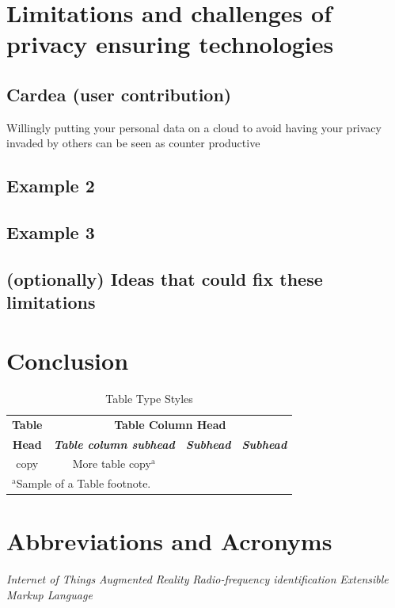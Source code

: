 \documentclass[conference]{IEEEtran}
\begin{document}
\section{Limitations and challenges of privacy ensuring technologies}\label{Limitations}
\subsection{Cardea (user contribution)}
Willingly putting your personal data on a cloud to avoid having your privacy invaded by others can be seen as counter productive
\subsection{Example 2}
\subsection{Example 3}
\subsection{(optionally) Ideas that could fix these limitations}

\section{Conclusion}\label{Conclusion}


\begin{table}[htbp]
\caption{Table Type Styles}
\begin{center}
\begin{tabular}{|c|c|c|c|}
\hline
\textbf{Table}&\multicolumn{3}{|c|}{\textbf{Table Column Head}} \\
\cline{2-4} 
\textbf{Head} & \textbf{\textit{Table column subhead}}& \textbf{\textit{Subhead}}& \textbf{\textit{Subhead}} \\
\hline
copy& More table copy$^{\mathrm{a}}$& &  \\
\hline
\multicolumn{4}{l}{$^{\mathrm{a}}$Sample of a Table footnote.}
\end{tabular}
\label{tab1}
\end{center}
\end{table}

\section*{Abbreviations and Acronyms}
\begin{acronym}[Bash]
 {\textit{Internet of Things}}
 {\textit{Augmented Reality}}
 {\textit{Radio-frequency identification}}
 {\textit{Extensible Markup Language}}
\end{acronym}


{\footnotesize
}
\end{document}
